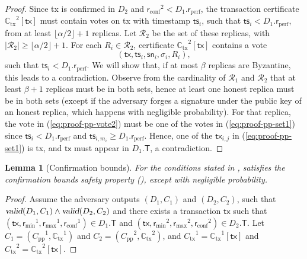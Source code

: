 \documentclass[pdflatex,sn-mathphys-num]{sn-jnl}%
\theoremstyle{thmstyleone}%
\theoremstyle{thmstyletwo}%
\theoremstyle{thmstylethree}%
\newtheorem{lemma}{Lemma}
\newcommand{\podtm}{\textsf{pod}\xspace}
\newcommand{\CR}{\ensuremath{\mathcal{R}}\xspace}
\newcommand{\op}[1]{\textsl{#1}}
\newcommand{\opValid}[1]{\op{valid}(#1)\xspace}
\newcommand{\operand}[1]{\textsf{#1}}
\newcommand{\tx}{\operand{tx}\xspace}
\newcommand{\round}{\operand{r}\xspace}
\newcommand{\client}{\operand{c}\xspace}
\newcommand{\rconf}{\ensuremath{\round_\text{conf}}\xspace}
\newcommand{\rmin}{\ensuremath{\round_\text{min}}\xspace}
\newcommand{\rmax}{\ensuremath{\round_\text{max}}\xspace}
\newcommand{\rperf}{\ensuremath{\round_\text{perf}}\xspace}
\newcommand{\rep}{\ensuremath{R}\xspace}
\newcommand{\allreps}{\CR}
\newcommand{\tsp}{\operand{ts}\xspace}
\newcommand{\txcert}{\ensuremath{C_\text{tx}}\xspace}
\newcommand{\alltxcert}{\ensuremath{\mathbb{C}_\text{tx}}\xspace}
\newcommand{\ppcert}{\ensuremath{C_\text{pp}}\xspace}
\newcommand{\cert}{\ensuremath{C}\xspace}
\newcommand{\txSet}{\operand{T}\xspace}
\newcommand{\Pod}{\ensuremath{D}\xspace}
\let\oldalpha\alpha
\renewcommand{\alpha}{\ensuremath{\oldalpha}\xspace}
\let\oldbeta\beta
\renewcommand{\beta}{\ensuremath{\oldbeta}\xspace}
\newcommand{\sn}{\operand{sn}\xspace}
\begin{document}
\begin{appendices}
\begin{proof}
	Since \tx is confirmed in $\Pod_2$ and $\rconf^2 < \Pod_1.\rperf$, the transaction certificate $\alltxcert^2[\tx]$ must contain votes on \tx with timestamp $\tsp_i$, such that $\tsp_i < \Pod_1.\rperf$, from at least $\lfloor \alpha/2 \rfloor + 1$ replicas.
	Let $\allreps_2$ be the set of these replicas, with $|\allreps_2| \geq \lfloor \alpha/2 \rfloor + 1$.
	For each $\rep_i \in \allreps_2$, certificate $\alltxcert^2[\tx]$ contains a vote
	\begin{equation}\label{eq:proof-pp-vote2}
		(\tx, \tsp_i, \sn_i, \sigma_i, \rep_i),
	\end{equation}
	such that $\tsp_i < \Pod_1.\rperf$.
	We will show that, if at most \beta replicas are Byzantine, this leads to a contradiction.
	Observe from the cardinality of $\allreps_1$ and $\allreps_2$ that at least $\beta + 1$ replicas must be in both sets, hence at least one honest replica must be in both sets (except if the adversary forges a signature under the public key of an honest replica, which happens with negligible probability).
	For that replica, the vote in (\ref{eq:proof-pp-vote2}) must be one of the votes in (\ref{eq:proof-pp-set1}) since $\tsp_i < \Pod_1.\rperf$ and $\tsp_{i, m_i} \geq \Pod_1.\rperf$.
	Hence, one of the $\tx_{i,j}$ in (\ref{eq:proof-pp-set1}) is \tx, and $\tx$ must appear in $\Pod_1.\txSet$, a contradiction.
\end{proof}


\begin{lemma}[Confirmation bounds]\label{lem:bounds-safety}
	For the conditions stated in ,  satisfies the \emph{confirmation bounds} safety property (), except with negligible probability.
\end{lemma}
\begin{proof}
	Assume the adversary outputs $(\Pod_1, \cert_1)$ and $(\Pod_2, \cert_2)$, such that $\opValid{\Pod_1, \cert_1} \land \opValid{\Pod_2, \cert_2}$ and there exists a transaction $\tx$ such that $(\tx, \rmin^1, \rmax^1, \rconf^1) \in \Pod_1.\txSet$ and $(\tx, \rmin^2, \rmax^2, \rconf^2) \in \Pod_2.\txSet$.
	Let $\cert_1 = (\ppcert^1, \alltxcert^1)$ and $\cert_2 = (\ppcert^2, \alltxcert^2)$, and $\txcert^1 = \alltxcert^1[\tx]$ and $\txcert^2 = \alltxcert^2[\tx]$.


\end{proof}
\end{appendices}
\end{document}
